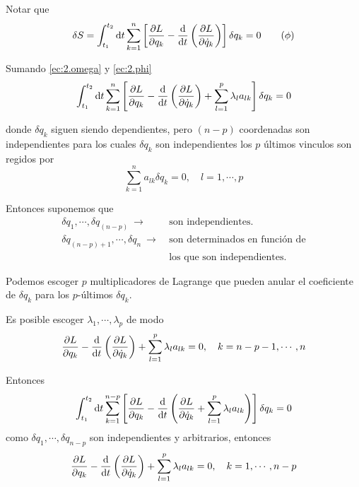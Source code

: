 \documentclass[../main]{subfiles}
\begin{document}
Notar que
\begin{equation}
    \delta S=\int_{t_1}^{t_2} \mathrm{d}t\sum_{k=1}^n \left[\pdv{L}{q_k}-\dv{}{t}\left(\pdv{L}{\dot{q}_k}\right)\right]\delta q_k=0 \tag{$\phi$} \label{ec:2.phi}
\end{equation}

Sumando \eqref{ec:2.omega} y \eqref{ec:2.phi}
\begin{equation}
    \int_{t_1}^{t_2}\mathrm{d}t \sum_{k=1}^n \left[\pdv{L}{q_k}-\dv{}{t}\left(\pdv{L}{\dot{q}_k}\right)+\sum_{l=1}^p \lambda_l a_{lk}\right]\delta q_k=0
\end{equation}

donde $\delta q_k$ siguen siendo dependientes, pero $(n-p)$ coordenadas son independientes para los cuales $\delta q_k$ son independientes los $p$ últimos vinculos son regidos por
\begin{equation}
    \sum_{k=1}^n a_{lk}\delta q_k=0, \quad l=1,\cdots, p
\end{equation}

Entonces suponemos que
\begin{align*}
    \delta q_1, \cdots, \delta q_{(n-p)} \ \rightarrow \ &\text{son independientes.}\\
    \delta q_{(n-p)+1}, \cdots, \delta q_n \ \rightarrow \ &\text{son determinados en función de}\\
    &\text{los que son independientes.}
\end{align*}

Podemos escoger $p$ multiplicadores de Lagrange que pueden anular el coeficiente de $\delta q_k$ para los $p$-últimos $\delta q_k$.

Es posible escoger $\lambda_1, \cdots, \lambda_p$ de modo
\begin{equation}
    \pdv{L}{q_k}-\dv{}{t}\left(\pdv{L}{\dot{q}_k}\right)+\sum_{l=1}^p \lambda_l a_{lk}=0, \quad k=n-p-1,\cdots, n
\end{equation}

Entonces
\begin{equation}
    \int_{t_1}^{t_2} \mathrm{d}t \sum_{k=1}^{n-p}\left[\pdv{L}{q_k}-\dv{}{t}\left(\pdv{L}{\dot{q}_k}+\sum_{l=1}^p \lambda_l a_{lk}\right)\right]\delta q_k=0
\end{equation}
como $\delta q_1, \cdots, \delta q_{n-p}$ son independientes y arbitrarios, entonces
\begin{equation}
    \pdv{L}{q_k}-\dv{}{t}\left(\pdv{L}{\dot{q}_k}\right)+\sum_{l=1}^p \lambda_l a_{lk}=0, \quad k=1,\cdots, n-p
\end{equation}
\end{document}
